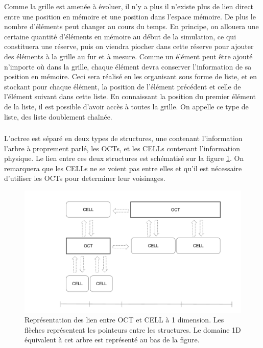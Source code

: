 Comme la grille est amenée à évoluer, il n'y a plus il n'existe plus de lien direct entre une position en mémoire et une position dans l'espace mémoire.
De plus le nombre d'éléments peut changer au cours du temps.
En principe, on allouera une certaine quantité d'éléments en mémoire au début de la simulation, ce qui constituera une réserve, puis on viendra piocher dans cette réserve pour ajouter des éléments à la grille au fur et à mesure.
Comme un élément peut être ajouté n'importe où dans la grille, chaque élément devra conserver l'information de sa position en mémoire.
Ceci sera réalisé en les organisant sous forme de liste, et en stockant pour chaque élément, la position de l'élément précédent et celle de l'élément suivant dans cette liste.
En connaissant la position du premier élément de la liste, il est possible d'avoir accès à toutes la grille.
On appelle ce type de liste, des liste doublement chaînée.


\subsubsection*{}

L'octree est séparé en deux types de structures, une contenant l'information l'arbre à proprement parlé, les OCTs, et les CELLs contenant l'information physique.
Le lien entre ces deux structures est schématisé sur la figure \ref{fig:octcell}.
On remarquera que les CELLs ne se voient pas entre elles et qu'il est nécessaire d'utiliser les OCTs pour determiner leur voisinages.

\begin{figure}
        \includegraphics[width=.95\linewidth]{img/02/octcell.pdf} 
        \caption[OCT et CELL]{Représentation des lien entre OCT et CELL à 1 dimension.
        Les flèches représentent les pointeurs entre les structures.
        Le domaine 1D équivalent à cet arbre est représenté au bas de la figure.
     	\label{fig:octcell}
}
\end{figure}

